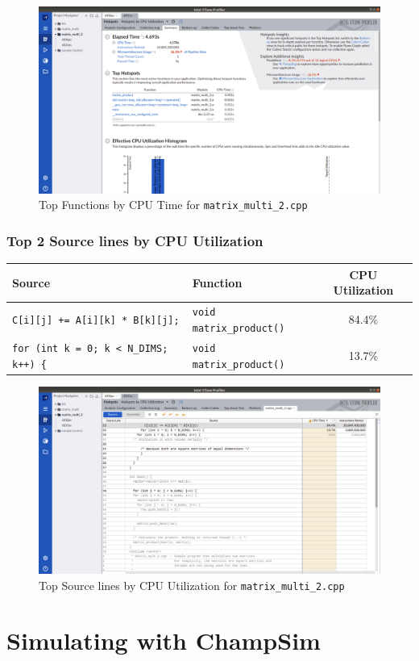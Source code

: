 \documentclass[11pt, swedish, openany]{book}
\begin{document}
\begin{figure}[H]
    \centering
    \includegraphics[scale=0.25]{vtune/matrix_multi_2/hs.png}
    \caption{Top Functions by CPU Time for \texttt{matrix\_multi\_2.cpp}}
\end{figure}

\newpage
\subsection*{Top 2 Source lines by CPU Utilization}
\begin{table}[H]
    \begin{tabular}{||l|l||c||}
        \hline
        Source                                        & Function                        & CPU Utilization \\
        \hline
        \texttt{C[i][j] += A[i][k] * B[k][j];}        & \texttt{void matrix\_product()} & 84.4\%          \\
        \texttt{for (int k = 0; k < N\_DIMS; k++) \{} & \texttt{void matrix\_product()} & 13.7\%          \\
        \hline
    \end{tabular}
\end{table}

\begin{figure}[H]
    \centering
    \includegraphics[scale=0.25]{vtune/matrix_multi_2/sc.png}
    \caption{Top Source lines by CPU Utilization for \texttt{matrix\_multi\_2.cpp}}
\end{figure}

\chapter{Simulating with ChampSim}
\end{document}
